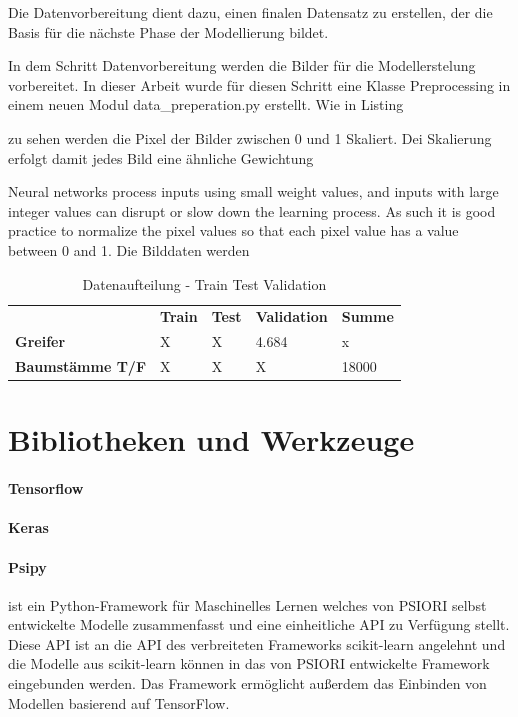 Die Datenvorbereitung dient dazu, einen finalen Datensatz zu erstellen, der die Basis für die nächste Phase der Modellierung bildet.


			In dem Schritt Datenvorbereitung werden die Bilder für die Modellerstelung vorbereitet. In dieser Arbeit wurde für diesen Schritt eine Klasse Preprocessing in einem neuen Modul data\_preperation.py  erstellt. Wie in Listing 
			
			 zu sehen werden die Pixel der Bilder zwischen 0 und 1 Skaliert. Dei Skalierung erfolgt damit jedes Bild eine ähnliche Gewichtung
			
			Neural networks process inputs using small weight values, and inputs with large integer values can disrupt or slow down the learning process. As such it is good practice to normalize the pixel values so that each pixel value has a value between 0 and 1.
	Die Bilddaten werden 		


	\begin{table}[ht]
	\centering
	\begin{tabularx}{\textwidth}{lllll}
		 & \textbf{Train} & \textbf{Test}  & \textbf{Validation} & \textbf{Summe} 								  \\
		\textbf{Greifer} 				 & 	X					&	X					& 4.684 				   & x 				\\
		\textbf{Baumstämme T/F}	 	  &  X					 &	X					 &	X							& 18000		\\
	\end{tabularx}

	\caption{Datenaufteilung - Train Test Validation}
	\label{table:DatenaufteilungTrainTestValidation}
 	\end{table}
 
	\section{Bibliotheken und Werkzeuge}
	\label{sec:BibliothekenundWerkzeuge}
		\paragraph{Tensorflow}
		\paragraph{Keras}
		\paragraph{Psipy} ist ein Python-Framework für Maschinelles Lernen welches von PSIORI selbst entwickelte Modelle zusammenfasst und eine einheitliche API zu Verfügung stellt. Diese API ist an die API des verbreiteten Frameworks scikit-learn angelehnt und die Modelle aus scikit-learn können in das von PSIORI entwickelte Framework eingebunden werden. Das Framework ermöglicht außerdem das Einbinden von Modellen basierend auf TensorFlow.\grqq [PSIORI]

